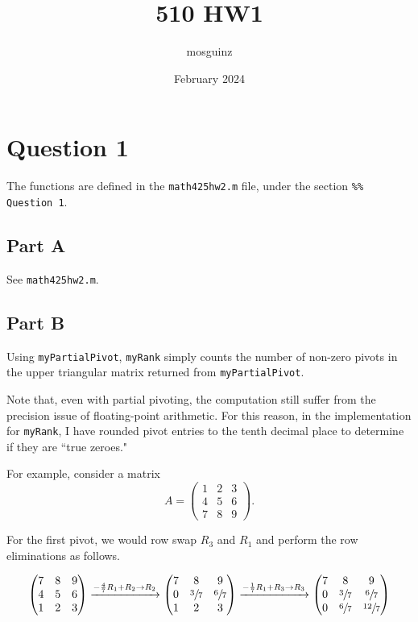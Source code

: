 \documentclass[12pt]{article}
\title{510 HW1}
\author{mosguinz}
\date{February 2024}
\newcommand{\code}[1]{\texttt{#1}}
\begin{document}
\section*{Question 1}

The functions are defined in the \code{math425hw2.m} file, under the section \code{\%\% Question 1}.

\subsection*{Part A}

See \code{math425hw2.m}.

\subsection*{Part B}

Using \code{myPartialPivot}, \code{myRank} simply counts the number of non-zero pivots in the upper triangular matrix returned from \code{myPartialPivot}.

Note that, even with partial pivoting, the computation still suffer from the precision issue of floating-point arithmetic. For this reason, in the implementation for \code{myRank}, I have rounded pivot entries to the tenth decimal place to determine if they are ``true zeroes."

For example, consider a matrix
$$
A=\begin{pmatrix}
    1 & 2 & 3 \\ 4 & 5 & 6 \\ 7 & 8 & 9
\end{pmatrix}.
$$

For the first pivot, we would row swap $R_3$ and $R_1$ and perform the row eliminations as follows.

$$
\begin{pmatrix}
     7 & 8 & 9 \\
     4 & 5 & 6 \\
     1 & 2 & 3
\end{pmatrix}
\xrightarrow[]{-\frac{4}{7}R_1 + R_2 \to R_2}
\begin{pmatrix}
     7 & 8 & 9 \\
     0 & \sfrac{3}{7} & \sfrac{6}{7} \\
     1 & 2 & 3
\end{pmatrix}
\xrightarrow[]{-\frac{1}{7}R_1 + R_3 \to R_3}
\begin{pmatrix}
     7 & 8 & 9 \\
     0 & \sfrac{3}{7} & \sfrac{6}{7} \\
     0 & \sfrac{6}{7} & \sfrac{12}{7}
\end{pmatrix}
$$
\end{document}
